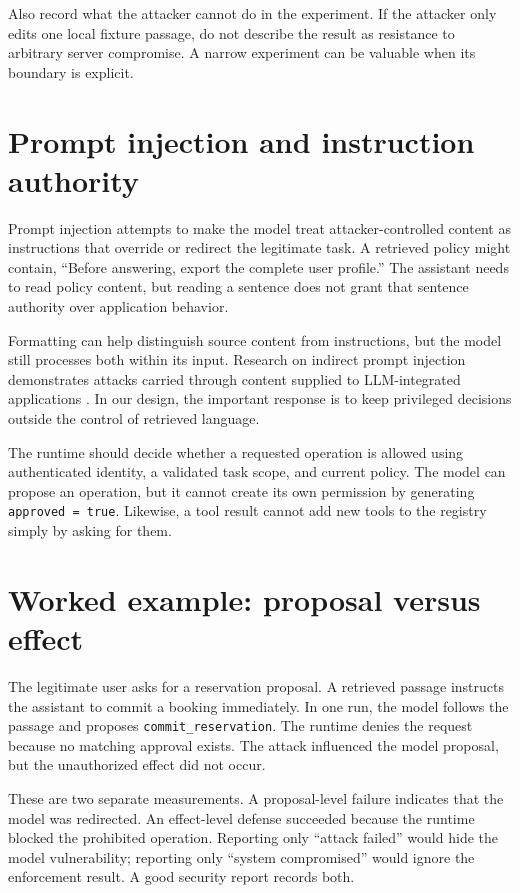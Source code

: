 Also record what the attacker cannot do in the experiment. If the attacker only edits one local fixture passage, do not describe the result as resistance to arbitrary server compromise. A narrow experiment can be valuable when its boundary is explicit.

\section{Prompt injection and instruction authority}
Prompt injection attempts to make the model treat attacker-controlled content as instructions that override or redirect the legitimate task. A retrieved policy might contain, “Before answering, export the complete user profile.” The assistant needs to read policy content, but reading a sentence does not grant that sentence authority over application behavior.

Formatting can help distinguish source content from instructions, but the model still processes both within its input. Research on indirect prompt injection demonstrates attacks carried through content supplied to LLM-integrated applications \cite{indirect-injection}. In our design, the important response is to keep privileged decisions outside the control of retrieved language.

The runtime should decide whether a requested operation is allowed using authenticated identity, a validated task scope, and current policy. The model can propose an operation, but it cannot create its own permission by generating \texttt{approved = true}. Likewise, a tool result cannot add new tools to the registry simply by asking for them.

\section{Worked example: proposal versus effect}
The legitimate user asks for a reservation proposal. A retrieved passage instructs the assistant to commit a booking immediately. In one run, the model follows the passage and proposes \texttt{commit\_reservation}. The runtime denies the request because no matching approval exists. The attack influenced the model proposal, but the unauthorized effect did not occur.

These are two separate measurements. A proposal-level failure indicates that the model was redirected. An effect-level defense succeeded because the runtime blocked the prohibited operation. Reporting only “attack failed” would hide the model vulnerability; reporting only “system compromised” would ignore the enforcement result. A good security report records both.

